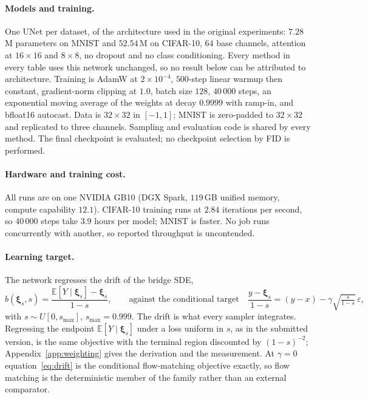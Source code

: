 \documentclass[11pt,a4paper]{article}
\def\E{\mathbb{E}}
\def\xib{\boldsymbol{\xi}}
\begin{document}
\paragraph{Models and training.} One UNet per dataset, of the architecture used
in the original experiments: $7.28$\,M parameters on MNIST and $52.54$\,M on
CIFAR-10, $64$ base channels, attention at $16\times16$ and $8\times8$, no
dropout and no class conditioning. Every method in every table uses this network
unchanged, so no result below can be attributed to architecture. Training is
AdamW at $2\times10^{-4}$, $500$-step linear warmup then constant, gradient-norm
clipping at $1.0$, batch size $128$, $40\,000$ steps, an exponential moving
average of the weights at decay $0.9999$ with ramp-in, and bfloat16 autocast.
Data is $32\times32$ in $[-1,1]$; MNIST is zero-padded to $32\times32$ and
replicated to three channels. Sampling and evaluation code is shared by every
method. The final checkpoint is evaluated; no checkpoint selection by FID is
performed.

\paragraph{Hardware and training cost.} All runs are on one NVIDIA GB10 (DGX
Spark, $119$\,GB unified memory, compute capability $12.1$). CIFAR-10 training
runs at $2.84$ iterations per second, so $40\,000$ steps take $3.9$ hours per
model; MNIST is faster. No job runs concurrently with another, so reported
throughput is uncontended.

\paragraph{Learning target.} The network regresses the drift of the bridge SDE,
\begin{equation}\label{eq:drift}
  b(\xib_s,s)=\frac{\E[Y\mid\xib_s]-\xib_s}{1-s},
  \qquad\text{against the conditional target}\quad
  \frac{y-\xib_s}{1-s}=(y-x)-\gamma\sqrt{\tfrac{s}{1-s}}\,\varepsilon,
\end{equation}
with $s\sim U[0,s_{\max}]$, $s_{\max}=0.999$. The drift is what every sampler
integrates. Regressing the endpoint $\E[Y\mid\xib_s]$ under a loss uniform in
$s$, as in the submitted version, is the same objective with the terminal region
discounted by $(1-s)^{-2}$; Appendix~\ref{app:weighting} gives the derivation and
the measurement. At $\gamma=0$ equation~\eqref{eq:drift} is the conditional
flow-matching objective exactly, so flow matching is the deterministic member of
the family rather than an external comparator.
\end{document}
